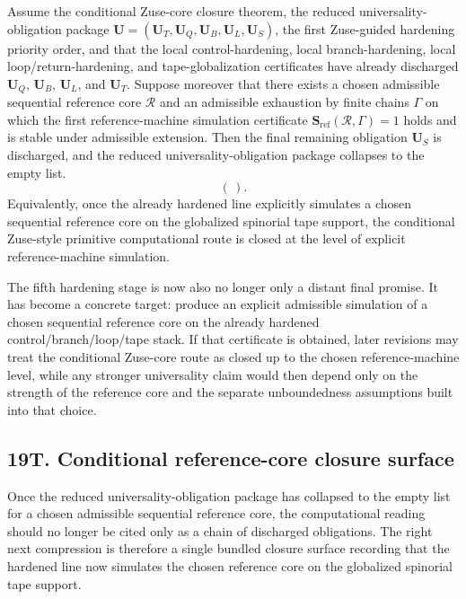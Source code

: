 \begin{proposition}
Assume the conditional Zuse-core closure theorem, the reduced universality-obligation package \(\mathbf U=(\mathbf U_T,\mathbf U_Q,\mathbf U_B,\mathbf U_L,\mathbf U_S)\), the first Zuse-guided hardening priority order, and that the local control-hardening, local branch-hardening, local loop/return-hardening, and tape-globalization certificates have already discharged \(\mathbf U_Q\), \(\mathbf U_B\), \(\mathbf U_L\), and \(\mathbf U_T\). Suppose moreover that there exists a chosen admissible sequential reference core \(\mathcal R\) and an admissible exhaustion by finite chains \(\Gamma\) on which the first reference-machine simulation certificate \(\mathbf S_{\mathrm{ref}}(\mathcal R,\Gamma)=1\) holds and is stable under admissible extension. Then the final remaining obligation \(\mathbf U_S\) is discharged, and the reduced universality-obligation package collapses to the empty list.
\[
(\,).
\]
Equivalently, once the already hardened line explicitly simulates a chosen sequential reference core on the globalized spinorial tape support, the conditional Zuse-style primitive computational route is closed at the level of explicit reference-machine simulation.
\end{proposition}

\begin{corollary}
The fifth hardening stage is now also no longer only a distant final promise. It has become a concrete target: produce an explicit admissible simulation of a chosen sequential reference core on the already hardened control/branch/loop/tape stack. If that certificate is obtained, later revisions may treat the conditional Zuse-core route as closed up to the chosen reference-machine level, while any stronger universality claim would then depend only on the strength of the reference core and the separate unboundedness assumptions built into that choice.
\end{corollary}


\subsection*{19T. Conditional reference-core closure surface}
Once the reduced universality-obligation package has collapsed to the empty list for a chosen admissible sequential reference core, the computational reading should no longer be cited only as a chain of discharged obligations. The right next compression is therefore a single bundled closure surface recording that the hardened line now simulates the chosen reference core on the globalized spinorial tape support.


